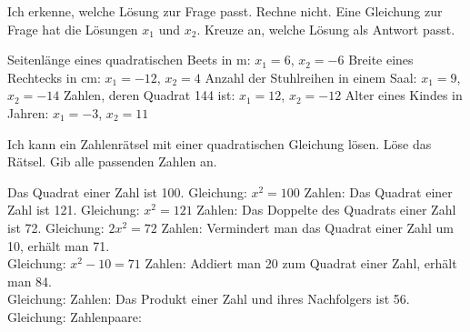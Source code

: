 \setcounter{aufgabe}{44}

\begin{aufgabe}{Ich erkenne, welche Lösung zur Frage passt.}
Rechne nicht. Eine Gleichung zur Frage hat die Lösungen $x_1$ und $x_2$. Kreuze an, welche Lösung als Antwort passt.
\begin{teile}
\teil Seitenlänge eines quadratischen Beets in m: $x_1 = 6$, $x_2 = -6$ \hfill {} \quad {} \quad {}
\teil Breite eines Rechtecks in cm: $x_1 = -12$, $x_2 = 4$ \hfill {} \quad {} \quad {}
\teil Anzahl der Stuhlreihen in einem Saal: $x_1 = 9$, $x_2 = -14$ \hfill {} \quad {} \quad {}
\teil Zahlen, deren Quadrat 144 ist: $x_1 = 12$, $x_2 = -12$ \hfill {} \quad {} \quad {}
\teil Alter eines Kindes in Jahren: $x_1 = -3$, $x_2 = 11$ \hfill {} \quad {} \quad {}
\end{teile}
\end{aufgabe}


\begin{aufgabe}{Ich kann ein Zahlenrätsel mit einer quadratischen Gleichung lösen.}
Löse das Rätsel. Gib alle passenden Zahlen an.
\begin{teile}
\teil Das Quadrat einer Zahl ist 100. \quad Gleichung: $x^2 = 100$ \hfill Zahlen: \leerfeld
\teil Das Quadrat einer Zahl ist 121. \quad Gleichung: $x^2 = 121$ \hfill Zahlen: \leerfeld
\teil Das Doppelte des Quadrats einer Zahl ist 72. \quad Gleichung: $2x^2 = 72$ \hfill Zahlen: \leerfeld
\teil Vermindert man das Quadrat einer Zahl um 10, erhält man 71. \\ Gleichung: $x^2 - 10 = 71$ \hfill Zahlen: \leerfeld
{}
\teil Addiert man 20 zum Quadrat einer Zahl, erhält man 84. \\ Gleichung: \leerfeld \hfill Zahlen: \leerfeld
\teil Das Produkt einer Zahl und ihres Nachfolgers ist 56. \\ Gleichung: \leerfeld \hfill Zahlenpaare: \leerfeld
\end{teile}
\end{aufgabe}

